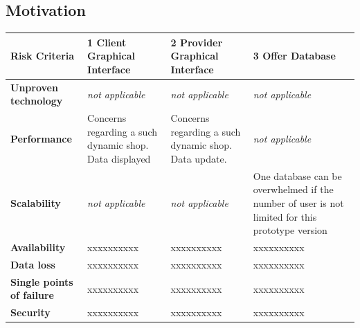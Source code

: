 \textbf{}

\subsection{Motivation}

\begin{table}[H]
        \begin{tabularx}{\textwidth}{|l|X|X|X|}
        \toprule
           \textbf{Risk Criteria} & \textbf{1 Client Graphical Interface} & \textbf{2 Provider Graphical Interface} & \textbf{3 Offer Database} \\
        \midrule
        \textbf{Unproven technology}& \textit{not applicable} & \textit{not applicable} & \textit{not applicable} \\
        \hline
        \textbf{Performance} & Concerns regarding a such dynamic shop. Data displayed & Concerns regarding a such dynamic shop. Data update. & \textit{not applicable} \\
        \hline
        \textbf{Scalability} & \textit{not applicable} & \textit{not applicable} & One database can be overwhelmed if the number of user is not limited for this prototype version \\
        \hline
        \textbf{Availability} & xxxxxxxxxx & xxxxxxxxxx & xxxxxxxxxx \\
        \hline
        \textbf{Data loss} & xxxxxxxxxx & xxxxxxxxxx & xxxxxxxxxx \\
        \hline
        \textbf{Single points of failure} & xxxxxxxxxx & xxxxxxxxxx & xxxxxxxxxx \\
        \hline
        \textbf{Security} & xxxxxxxxxx & xxxxxxxxxx & xxxxxxxxxx \\
        \bottomrule
    \end{tabularx}
\end{table}


